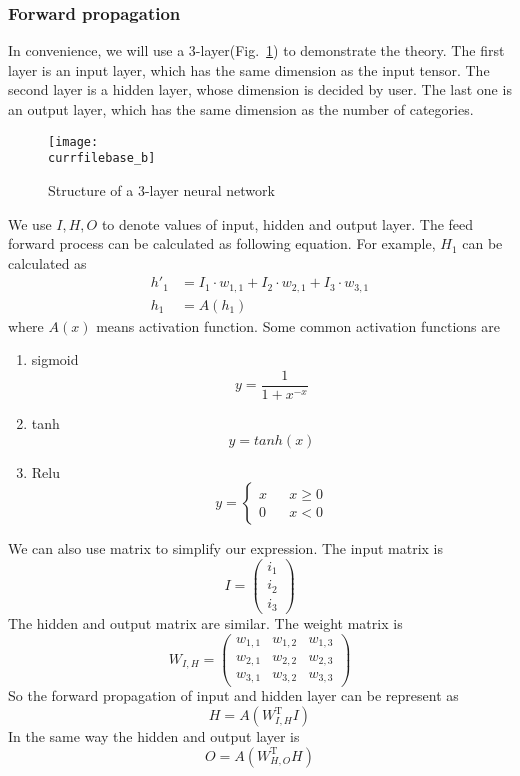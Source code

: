 \documentclass[catalog.tex]{subfiles}
\begin{document}
\subsubsection{Forward propagation} 
In convenience, we will use a 3-layer(Fig.~\ref{fig:\currfilebase_b}) to demonstrate the theory. The first layer is an input layer, which has the same dimension as the input tensor. The second layer is a hidden layer, whose dimension is decided by user. The last one is an output layer, which has the same dimension as the number of categories.
\begin{figure}[!htb]
\centering
\texttt{[image: \\currfilebase\_b]}
	\caption{Structure of a 3-layer neural network}
	\label{fig:\currfilebase_b}
\end{figure}
We use $I, H, O$ to denote values of input, hidden and output layer. The feed forward process can be calculated as following equation. For example, $H_1$ can be calculated as 
\begin{align}
h'_1 &= I_1\cdot w_{1,1} + I_2\cdot w_{2,1} + I_3\cdot w_{3,1}\\
h_1 &= A(h_1)
\end{align}
where $A(x)$ means activation function. Some common activation functions are
\begin{enumerate}
\item sigmoid
\begin{equation}
y=\frac{1}{1+x^{-x}}
\end{equation}
\item tanh
\begin{equation}
y=tanh(x)
\end{equation}
\item Relu
\begin{equation}
y=\left\{
	\begin{aligned}
	x & & x \geq 0\\
	0 & & x < 0
	\end{aligned}
\right.
\end{equation}
\end{enumerate}
We can also use matrix to simplify our expression. The input matrix is 
\begin{equation}
I=
\left(
\begin{array}{c}
i_1\\i_2\\i_3
\end{array}
\right)
\end{equation}
The hidden and output matrix are similar. The weight matrix is
\begin{equation}
W_{I,H}=
\left(
\begin{array}{ccc}
w_{1,1} & w_{1,2} & w_{1,3}\\
w_{2,1} & w_{2,2} & w_{2,3}\\
w_{3,1} & w_{3,2} & w_{3,3}
\end{array}
\right)
\end{equation}
So the forward propagation of input and hidden layer can be represent as
\begin{equation}
H=A(W_{I,H}^{\mathrm{T}}I)
\end{equation}
In the same way the hidden and output layer is 
\begin{equation}
O=A(W_{H,O}^{\mathrm{T}}H)
\end{equation}
\end{document}
